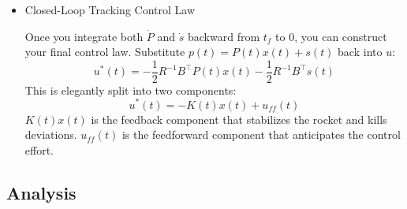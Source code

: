 \documentclass[letterpaper, 10 pt, conference]{ieeeconf}
\begin{document}
\begin{itemize}
        Since the expression must hold true for any arbitrary trajectory $x(t)$, we get the following tracking Riccati pair:
    
        \begin{itemize}
            \item  Matrix Riccati Differential Equation (The Feedback Rulebook):
            \[\dot{P} = -PA - A^\top P + \frac{1}{2}PBR^{-1}B^\top P - 2Q\]
            
            \item Auxiliary Vector Differential Equation (The Feedforward Tracker):
            \[\dot{s} = - \left( A^\top - \frac{1}{2}PBR^{-1}B^\top \right) s + 2Q x_{\text{ref}}\]
        \end{itemize}

        Since $p(t_f) = P(t_f)x(t_f) + s(t_f) = 0$ must hold for an arbitrary terminal state, both pieces are integrated backward from the homogeneous terminal conditions
        \[P(t_f) = 0, \qquad s(t_f) = 0,\]
        reflecting the absence of any terminal penalty in the Part~II objective.
        
    
    \item Closed-Loop Tracking Control Law

        Once you integrate both $\dot{P}$ and $\dot{s}$ backward from $t_f$ to $0$, you can construct your final control law. Substitute $p(t) = P(t)x(t) + s(t)$ back into $u$: 
        \[u^*(t) = -\frac{1}{2} R^{-1} B^\top P(t) x(t) - \frac{1}{2} R^{-1} B^\top s(t)\]
        This is elegantly split into two components:
        \[u^*(t) = -K(t)x(t) + u_{ff}(t)\]
        $K(t)x(t)$ is the feedback component that stabilizes the rocket and kills deviations. $u_{ff}(t)$ is the feedforward component that anticipates the control effort.
    
\end{itemize}

\subsection{Analysis}
\end{document}
